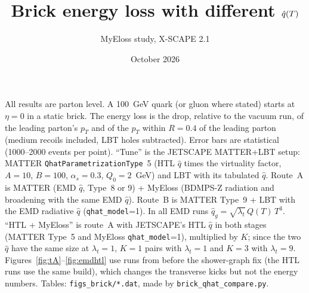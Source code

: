 \documentclass[11pt]{article}
\title{Brick energy loss with different $\qhat(T)$}
\author{MyEloss study, X-SCAPE 2.1}
\date{October 2026}
\newcommand{\qhat}{\hat q}
\newcommand{\code}[1]{\texttt{#1}}
\begin{document}
\maketitle

\noindent All results are parton level. A 100~GeV quark (or gluon where stated) starts at
$\eta=0$ in a static brick. The energy loss is the drop, relative to the vacuum run, of the
leading parton's $p_T$ and of the $p_T$ within $R=0.4$ of the leading parton (medium recoils
included, LBT holes subtracted). Error bars are statistical (1000--2000 events per point).
``Tune'' is the JETSCAPE MATTER+LBT setup: MATTER \code{QhatParametrizationType}~5 (HTL
$\qhat$ times the virtuality factor, $A=10$, $B=100$, $\alpha_s=0.3$, $Q_0=2$~GeV) and LBT with
its tabulated $\qhat$. Route~A is MATTER (EMD $\qhat$, Type~8 or 9) + MyEloss (BDMPS-Z radiation
and broadening with the same EMD $\qhat$). Route~B is MATTER Type~9 + LBT with the EMD radiative
$\qhat$ (\code{qhat\_model}=1). In all EMD runs $\qhat_g=\sqrt{\lambda_t}\,Q(T)\,T^3$. ``HTL + MyEloss'' is route~A with JETSCAPE's HTL $\qhat$ in both stages (MATTER Type~5 and MyEloss \code{qhat\_model}=1), multiplied by $K$; since the two $\qhat$ have the same size at $\lambda_t=1$, $K=1$ pairs with $\lambda_t=1$ and $K=3$ with $\lambda_t=9$.
Figures~\ref{fig:tA}--\ref{fig:emdhtl} use runs from before the shower-graph fix (the HTL runs use the same build), which changes the
transverse kicks but not the energy numbers. Tables: \texttt{figs\_brick/*.dat}, made by
\texttt{brick\_qhat\_compare.py}.
\end{document}
